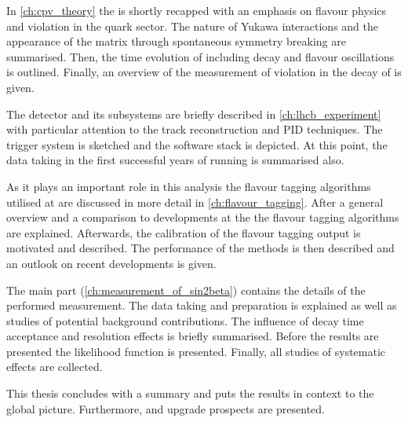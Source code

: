In \cref{ch:cpv_theory} the \SM is shortly recapped with an emphasis on flavour
physics and \CP violation in the quark sector. The nature of Yukawa
interactions and the appearance of the \CKM matrix through spontaneous symmetry
breaking are summarised. Then, the time evolution of \Bmesons including decay
and flavour oscillations is outlined. Finally, an overview of the measurement of
\CP violation in the decay of \BdToJpsiKS is given.

The \LHCb detector and its subsystems are briefly described in
\cref{ch:lhcb_experiment} with particular attention to the track reconstruction
and \acl{PID} techniques. The \LHCb trigger system is sketched and the software
stack is depicted. At this point, the data taking in the first successful years
of running is summarised also.

As it plays an important role in this analysis the flavour tagging algorithms
utilised at \LHCb are discussed in more detail in \cref{ch:flavour_tagging}.
After a general overview and a comparison to developments at the \BFactories the
flavour tagging algorithms are explained. Afterwards, the calibration of the
flavour tagging output is motivated and described. The performance of the
methods is then described and an outlook on recent developments is given.

The main part (\cref{ch:measurement_of_sin2beta}) contains the details of the
performed measurement. The data taking and preparation is explained as well as
studies of potential background contributions. The influence of decay time
acceptance and resolution effects is briefly summarised. Before the results are
presented the likelihood function is presented. Finally, all studies of
systematic effects are collected.

This thesis concludes with a summary and puts the results in context to the
global \CKM picture. Furthermore, \RunTwo and \LHCb upgrade prospects are
presented.
